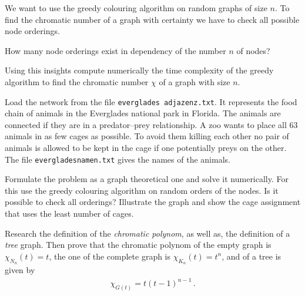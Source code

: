    
		
		
		\subexercise[%
  topic=Time Complexity of the Greedy Colouring Algorithm,
    ]

We want to use the greedy colouring algorithm on random graphs of size $n$. To find the chromatic number of a graph with certainty we have to check all possible node orderings. 

How many node orderings exist in dependency of the number $n$ of nodes? 

Using this insights compute numerically the time complexity of the greedy algorithm to find the chromatic number $\chi$ of a graph with size $n$.


\exercise[%
  topic=Placing Animals in Cages ,
    ]



Load the network from the file  {\tt everglades\textunderscore
    adjazenz.txt}. It represents the food chain of animals in the
Everglades national park in Florida. The animals are connected if they
are in a predator--prey relationship. A zoo wants to place all $63$
animals in as few cages as possible. To avoid them killing each other no
pair of animals is allowed to be kept in the cage if one potentially
preys on the other. The file  {\tt everglades\textunderscore namen.txt}
gives the names of the animals.

Formulate the problem as a graph theoretical one and solve it
numerically. For this use the greedy colouring algorithm on random
orders of the nodes. Is it possible to check all orderings? Illustrate
the graph and show the cage assignment that uses the least number of
cages.

\exercise[%
  topic=Chromatic Polynom,
    ]

Research the definition of the \emph{chromatic polynom}, as well as, the definition of a \emph{tree} graph. Then prove that the chromatic polynom of the empty graph is $\chi_{N_n}(t) =t$, the one of the complete graph is $\chi_{K_n}(t) =t^n$, and of a tree is given by
\begin{align}
\chi_{G(t)} = t(t-1)^{n-1}\,.
\end{align}

 


	

